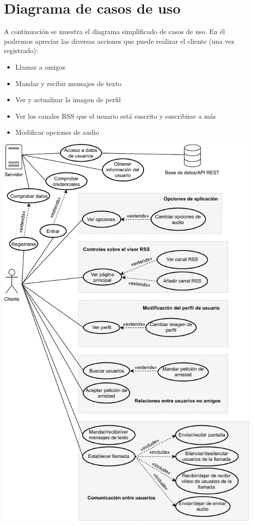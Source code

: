 \documentclass[12pt, a4paper]{book} %
\begin{document}
		\section{Diagrama de casos de uso}
		A continuación se muestra el diagrama simplificado de casos de uso. En él podremos apreciar las diversas acciones que puede realizar el cliente (una vez registrado):
		\begin{itemize}
			\item Llamar a amigos
			\item Mandar y recibir mensajes de texto
			\item Ver y actualizar la imagen de perfil
			\item Ver los canales RSS que el usuario está suscrito y suscribirse a más
			\item Modificar opciones de audio
		\end{itemize}		
		\newpage
		\includegraphics[width=\textwidth,height=\textheight, keepaspectratio]{img/UseCaseClient.pdf}\\
\end{document}
